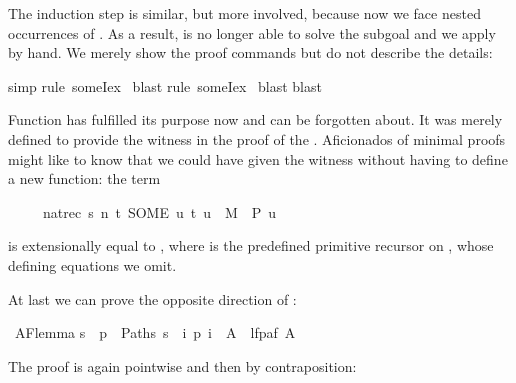 \begin{isabellebody}
\begin{isamarkuptxt}
The induction step is similar, but more involved, because now we face nested
occurrences of . As a result,  is no longer able to
solve the subgoal and we apply  by hand.  We merely
show the proof commands but do not describe the details:%
\end{isamarkuptxt}%
simp{\isacharparenright}\isanewline
{}rule\ someI{}{\isacharunderscore}ex{\isacharparenright}\isanewline
\ blast{\isacharparenright}\isanewline
{}rule\ someI{}{\isacharunderscore}ex{\isacharparenright}\isanewline
\ blast{\isacharparenright}\isanewline
{}blast{\isacharparenright}\isanewline
{}%
\begin{isamarkuptext}%
Function  has fulfilled its purpose now and can be forgotten
about. It was merely defined to provide the witness in the proof of the
. Aficionados of minimal proofs might like to know
that we could have given the witness without having to define a new function:
the term
\begin{isabelle}%
\ \ \ \ \ nat{\isacharunderscore}rec\ s\ {\isacharparenleft}{\isasymlambda}n\ t{\isachardot}\ SOME\ u{\isachardot}\ {\isacharparenleft}t{\isacharcomma}\ u{\isacharparenright}\ {\isasymin}\ M\ {\isasymand}\ P\ u{\isacharparenright}%
\end{isabelle}
is extensionally equal to ,
where  is the predefined primitive recursor on , whose defining
equations we omit.%
\end{isamarkuptext}%
%
\begin{isamarkuptext}%
At last we can prove the opposite direction of :%
\end{isamarkuptext}%
\ AF{\isacharunderscore}lemma{}{\isacharcolon}\isanewline
{\isachardoublequote}{\isacharbraceleft}s{\isachardot}\ {\isasymforall}\ p\ {\isasymin}\ Paths\ s{\isachardot}\ {\isasymexists}\ i{\isachardot}\ p\ i\ {\isasymin}\ A{\isacharbraceright}\ {\isasymsubseteq}\ lfp{\isacharparenleft}af\ A{\isacharparenright}{\isachardoublequote}%
\begin{isamarkuptxt}%
\noindent
The proof is again pointwise and then by contraposition:%
\end{isamarkuptxt}%

\end{isabellebody}
